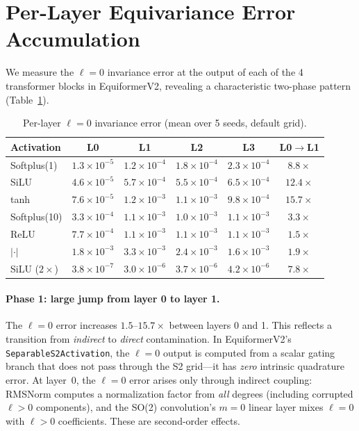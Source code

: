 \documentclass[10pt,twocolumn]{article}
\begin{document}
\section{Per-Layer Equivariance Error Accumulation}
\label{sec:perlayer}

We measure the $\ell{=}0$ invariance error at the output of each of the 4 transformer
blocks in EquiformerV2, revealing a characteristic two-phase pattern
(Table~\ref{tab:perlayer}).

\begin{table}[t]
  \caption{Per-layer $\ell{=}0$ invariance error (mean over 5 seeds, default grid).}
  \label{tab:perlayer}
  \centering
  \small
  \begin{tabular}{lcccc c}
    \toprule
    Activation & L0 & L1 & L2 & L3 & L0$\to$L1 \\
    \midrule
    Softplus(1)    & $1.3{\times}10^{-5}$ & $1.2{\times}10^{-4}$ & $1.8{\times}10^{-4}$ & $2.3{\times}10^{-4}$ & $8.8\times$ \\
    SiLU           & $4.6{\times}10^{-5}$ & $5.7{\times}10^{-4}$ & $5.5{\times}10^{-4}$ & $6.5{\times}10^{-4}$ & $12.4\times$ \\
    tanh           & $7.6{\times}10^{-5}$ & $1.2{\times}10^{-3}$ & $1.1{\times}10^{-3}$ & $9.8{\times}10^{-4}$ & $15.7\times$ \\
    Softplus(10)   & $3.3{\times}10^{-4}$ & $1.1{\times}10^{-3}$ & $1.0{\times}10^{-3}$ & $1.1{\times}10^{-3}$ & $3.3\times$ \\
    ReLU           & $7.7{\times}10^{-4}$ & $1.1{\times}10^{-3}$ & $1.1{\times}10^{-3}$ & $1.1{\times}10^{-3}$ & $1.5\times$ \\
    $|\cdot|$      & $1.8{\times}10^{-3}$ & $3.3{\times}10^{-3}$ & $2.4{\times}10^{-3}$ & $1.6{\times}10^{-3}$ & $1.9\times$ \\
    \midrule
    SiLU ($2\times$)  & $3.8{\times}10^{-7}$ & $3.0{\times}10^{-6}$ & $3.7{\times}10^{-6}$ & $4.2{\times}10^{-6}$ & $7.8\times$ \\
    \bottomrule
  \end{tabular}
\end{table}

\paragraph{Phase 1: large jump from layer 0 to layer 1.}
The $\ell{=}0$ error increases $1.5$--$15.7\times$ between layers 0 and 1. This reflects
a transition from \emph{indirect} to \emph{direct} contamination. In EquiformerV2's
\texttt{SeparableS2Activation}, the $\ell{=}0$ output is computed from a scalar gating
branch that does not pass through the S2 grid---it has \emph{zero} intrinsic quadrature
error. At layer~0, the $\ell{=}0$ error arises only through indirect coupling:
RMSNorm computes a normalization factor from \emph{all} degrees (including corrupted
$\ell{>}0$ components), and the SO(2) convolution's $m{=}0$ linear layer mixes
$\ell{=}0$ with $\ell{>}0$ coefficients. These are second-order effects.
\end{document}
